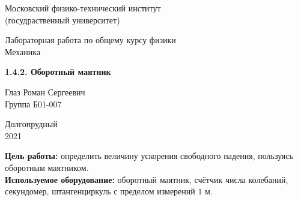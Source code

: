 \documentclass[a4paper, 12pt]{article} %
\begin{document}


\begin{titlepage}

    \newpage
    \begin{center}
        \normalsize Московский физико-технический институт \\(госудраственный университет)
    \end{center}

    \vspace{6em}

    \begin{center}
        \Large Лабораторная работа по общему курсу физики\\Механика
    \end{center}

    \vspace{1em}

    \begin{center}
        \Large \textbf{1.4.2. Оборотный маятник}
    \end{center}

    \vspace{2em}

    \begin{center}
        \large Глаз Роман Сергеевич \\
        Группа Б01-007
    \end{center}

    \vspace{\fill}

    \begin{center}
        Долгопрудный \\2021
    \end{center}
    
\end{titlepage}



    \thispagestyle{empty}
    \newpage
    \tableofcontents
    \newpage
    \setcounter{page}{1}

\textbf{Цель работы:} определить величину ускорения свободного падения, пользуясь оборотным маятником.\\

\textbf{Используемое оборудование:} оборотный маятник, счётчик числа колебаний, секундомер, штангенциркуль с пределом измерений $1$ м.
\end{document}
